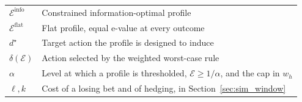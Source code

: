 \begin{table}[htbp]
\begin{tabular}{@{}l>{\raggedright\arraybackslash}p{}@{}}
$\mathcal E^{\mathrm{info}}$ & Constrained information-optimal profile \\
$\mathcal E^{\mathrm{flat}}$ & Flat profile, equal e-value at every outcome \\
$d^\star$ & Target action the profile is designed to induce \\
$\delta(\mathcal E)$ & Action selected by the weighted worst-case rule \\
$\alpha$ & Level at which a profile is thresholded, $\mathcal E\geq1/\alpha$, and the cap in $w_h$ \\
$\ell,k$ & Cost of a losing bet and of hedging, in Section~\ref{sec:sim_window} \\
\bottomrule\end{tabular}
\end{table}
